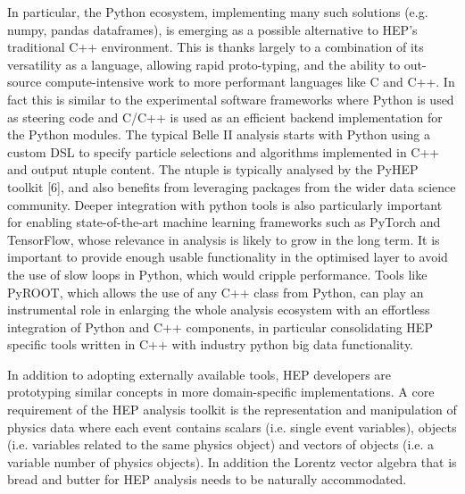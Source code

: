 \documentclass[11pt,a4paper]{article}
\begin{document}
In particular, the Python ecosystem, implementing many such solutions
(e.g. numpy, pandas dataframes), is emerging as a possible alternative
to HEP's traditional C++ environment. This is thanks largely to a
combination of its versatility as a language, allowing rapid
proto-typing, and the ability to out-source compute-intensive work to
more performant languages like C and C++. In fact this is similar to the
experimental software frameworks where Python is used as steering code
and C/C++ is used as an efficient backend implementation for the Python
modules. The typical Belle II analysis starts with Python using a custom
DSL to specify particle selections and algorithms implemented in C++ and
output ntuple content. The ntuple is typically analysed by the PyHEP
toolkit {[}6{]}, and also benefits from leveraging packages from the
wider data science community. Deeper integration with python tools is
also particularly important for enabling state-of-the-art machine
learning frameworks such as PyTorch and TensorFlow, whose relevance in
analysis is likely to grow in the long term. It is important to provide
enough usable functionality in the optimised layer to avoid the use of
slow loops in Python, which would cripple performance. Tools like
PyROOT, which allows the use of any C++ class from Python, can play an
instrumental role in enlarging the whole analysis ecosystem with an
effortless integration of Python and C++ components, in particular
consolidating HEP specific tools written in C++ with industry python big
data functionality.

In addition to adopting externally available tools, HEP developers are
prototyping similar concepts in more domain-specific implementations. A
core requirement of the HEP analysis toolkit is the representation and
manipulation of physics data where each event contains scalars (i.e.
single event variables), objects (i.e. variables related to the same
physics object) and vectors of objects (i.e. a variable number of
physics objects). In addition the Lorentz vector algebra that is bread
and butter for HEP analysis needs to be naturally accommodated.
\end{document}

